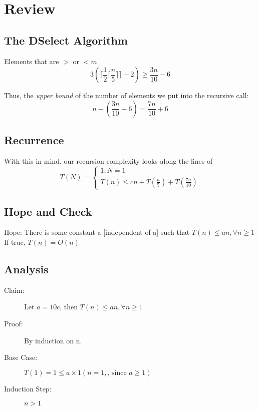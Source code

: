 \documentclass{article}
\begin{document}
\section*{Review}
\subsection*{The DSelect Algorithm}

Elements that are $>$ or \(< m\)
\begin{equation*}
    3 \left( \lceil \frac{1}{2} \lceil \frac{n}{5} \rceil \rceil - 2\right) \geq \frac{3n}{10} - 6
\end{equation*}

Thus, the \emph{upper bound} of the number of elements we put into the recursive call:
\begin{equation*}
    n - \left(\frac{3n}{10} - 6\right) = \frac{7n}{10} + 6
\end{equation*}

\subsection*{Recurrence}
With this in mind, our recursion complexity looks along the lines of
\begin{equation*}
    T(N) =
    \begin{cases}
        1, N = 1 \\
        T(n) \leq cn + T \left( \frac{n}{5}\right) + T \left( \frac{7n}{10}\right)
    \end{cases}
\end{equation*}

\subsection*{Hope and Check}
Hope: There is some constant a [independent of a] such that \(T(n) \leq an, \forall n \geq 1\)
If true, \(T(n) = O(n)\)

\subsection*{Analysis}
\begin{description}
    \item[Claim:]  Let \(a = 10c\), then \(T(n) \leq an, \forall n \geq 1\)
    \item[Proof:] By induction on n.
    \item[Base Case:] \(T(1) = 1 \leq a \times 1 (n = 1, \text{, since } a \geq 1)\)
    \item[Induction Step:] \(n > 1\)
\end{description}
\end{document}
